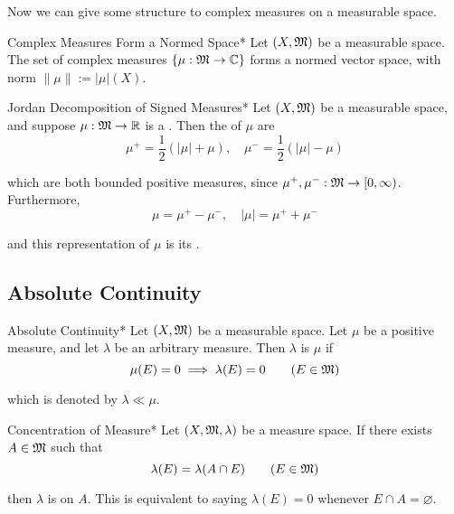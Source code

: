 Now we can give some structure to complex measures on a measurable space. 

\begin{definition}{Complex Measures Form a Normed Space}*
    Let $(X, \mathfrak{M})$ be a measurable space. The set of complex measures $\{\mu : \mathfrak{M} \to \mathbb{C}\}$ forms a normed vector space, with norm $\|\mu\| := |\mu|(X)$. 
\end{definition}

\begin{definition}{Jordan Decomposition of Signed Measures}*
    Let $(X, \mathfrak{M})$ be a measurable space, and suppose $\mu : \mathfrak{M} \to \mathbb{R}$ is a . Then the  of $\mu$ are 
    $$
        \mu^+ = \frac{1}{2}(|\mu| + \mu), 
        \quad 
        \mu^- = \frac{1}{2}(|\mu| - \mu)
    $$

    which are both bounded positive measures, since $\mu^+, \mu^- : \mathfrak{M} \to [0, \infty)$. Furthermore, 
    $$
        \mu = \mu^+ - \mu^-, 
        \quad
        |\mu| = \mu^+ + \mu^-
    $$

    and this representation of $\mu$ is its . 
\end{definition}

\subsection{Absolute Continuity}

\begin{definition}{Absolute Continuity}*
    Let $(X, \mathfrak{M})$ be a measurable space. Let $\mu$ be a positive measure, and let $\lambda$ be an arbitrary measure. Then $\lambda$ is  $\mu$ if 
    $$
        \mu(E) = 0 \implies \lambda(E) = 0
        \qquad (E \in \mathfrak{M})
    $$

    which is denoted by $\lambda \ll \mu$. 
\end{definition}

\begin{definition}{Concentration of Measure}*
    Let $(X, \mathfrak{M}, \lambda)$ be a measure space. If there exists $A \in \mathfrak{M}$ such that
    $$
        \lambda(E) = \lambda(A \cap E)
        \qquad (E \in \mathfrak{M})
    $$

    then $\lambda$ is  on $A$. This is equivalent to saying $\lambda(E) = 0$ whenever $E \cap A = \varnothing$.
\end{definition}

